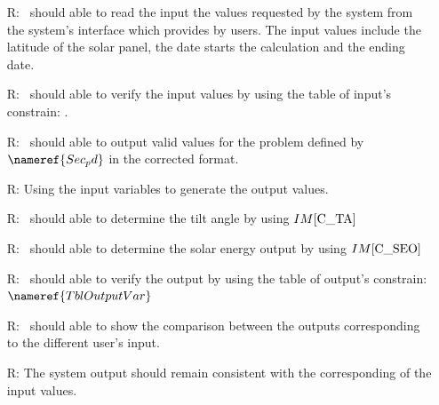\documentclass[12pt]{article}
\newcommand{\iref}[1]{IM\ref{#1}}
\newcounter{reqnum} %
\begin{document}
\noindent \begin{itemize}

\item[R\refstepcounter{reqnum}\thereqnum \label{R_Inputs}:] \progname~should able to read the input the values 
requested by the system from the
system's interface which provides by users. The input values include
the latitude of the solar panel, the date starts the calculation and the ending date.\\

\item[R\refstepcounter{reqnum}\thereqnum \label{R_Inputs}:]\progname~should able to verify the input values by using the 
table of input's constrain: . \\


\item[R\refstepcounter{reqnum}\thereqnum \label{R_OutputInputs}:] \progname~should able to output valid values for the problem defined by $\nameref{Sec_pd} $ in the corrected format.\\


\item[R\refstepcounter{reqnum}\thereqnum \label{R_VerifyOutput}:] Using the input variables to generate the output values.\\


\item[R\refstepcounter{reqnum}\thereqnum \label{R_Calculate}:] \progname~should able to determine the tilt angle by using $\iref{C_TA}$\\

\item[R\refstepcounter{reqnum}\thereqnum \label{R_Calculate}:] \progname~should able to determine the solar energy output by 
using $\iref{C_SEO}$\\


\item[R\refstepcounter{reqnum}\thereqnum \label{R_VerifyOutput}:] \progname~should able to verify the output by using the table of output's constrain: $\nameref{TblOutputVar}$\\



\item[R\refstepcounter{reqnum}\thereqnum \label{R_Outputshowt}:] \progname~should able to show the comparison
between the outputs corresponding to the different user's input.\\

\item[R\refstepcounter{reqnum}\thereqnum \label{R_Outputconsist}:]
The system output should remain consistent with
the corresponding of the input values.


\end{itemize}
\end{document}
